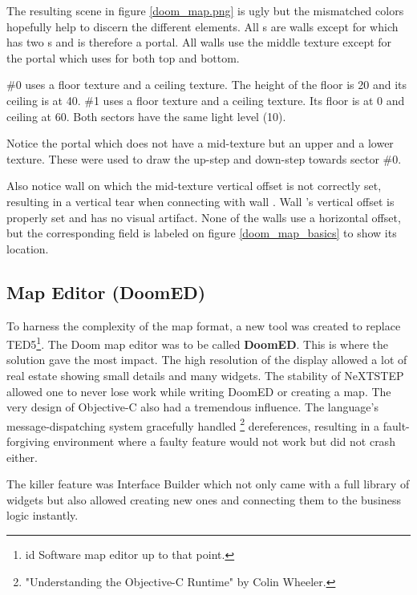 \par

The resulting scene in figure \ref{doom_map.png} is ugly but the mismatched colors hopefully help to discern the different elements. All s are walls except for  which has two s and is therefore a portal. All walls use the  middle texture except for the portal which uses  for both top and bottom.\\
\par
{} \#0 uses a  floor texture and a  ceiling texture. The height of the floor is 20 and its ceiling is at 40.  \#1 uses a  floor texture and a  ceiling texture. Its floor is at 0 and ceiling at 60. Both sectors have the same light level (10).\\
\par
   Notice the portal  which does not have a mid-texture but an upper and a lower texture. These were used to draw the up-step and down-step towards sector \#0.\\
\par
Also notice wall  on which the mid-texture vertical offset is not correctly set, resulting in a vertical tear when connecting with wall . Wall 's vertical offset is properly set and has no visual artifact. None of the walls use a horizontal offset, but the corresponding field is labeled  on figure \ref{doom_map_basics} to show its location.\\ 
\pagebreak



\subsection{Map Editor (DoomED)}
To harness the complexity of the map format, a new tool was created to replace TED5\footnote{id Software map editor up to that point.}. The Doom map editor was to be called \textbf{DoomED}. This is where the \NeXT solution gave the most impact. The high resolution of the display allowed a lot of real estate showing small details and many widgets. The stability of NeXTSTEP allowed one to never lose work while writing DoomED or creating a map.
The very design of Objective-C also had a tremendous influence. The language's message-dispatching system gracefully handled \footnote{"Understanding the Objective-C Runtime" by Colin Wheeler.} dereferences, resulting in a fault-forgiving environment where a faulty feature would not work but did not crash either.\\
\par   
The killer feature was Interface Builder which not only came with a full library of widgets but also allowed creating new ones and connecting them to the business logic instantly.\\
\par
{}
\par

